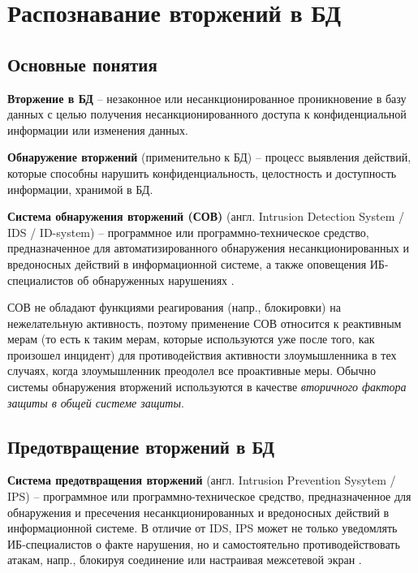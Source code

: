 
\section{Распознавание вторжений в БД}



\subsection{Основные понятия}

\textbf{Вторжение в БД} -- незаконное или несанкционированное проникновение в базу данных с целью получения несанкционированного доступа к конфиденциальной информации или изменения данных.

\textbf{Обнаружение вторжений} (применительно к БД) -- процесс выявления действий,
которые способны нарушить конфиденциальность, целостность и доступность информации,
хранимой в БД.

\textbf{Система обнаружения вторжений (СОВ)} (англ. Intrusion Detection System / IDS / ID-system) -- программное или программно-техническое средство, предназначенное для автоматизированного обнаружения несанкционированных и вредоносных действий в информационной системе, а также оповещения ИБ-специалистов об обнаруженных нарушениях \cite{kasperskyIDS}.

СОВ не обладают функциями реагирования (напр., блокировки) на нежелательную активность, поэтому применение СОВ относится к реактивным мерам (то есть к таким мерам, которые используются уже после того, как произошел инцидент) для противодействия активности злоумышленника в тех случаях, когда злоумышленник преодолел все проактивные меры. Обычно системы обнаружения вторжений используются в качестве \textit{вторичного фактора защиты в общей системе защиты}.



\subsection{Предотвращение вторжений в БД}

\textbf{Система предотвращения вторжений} (англ. Intrusion Prevention Sysytem / IPS) -- программное или программно-техническое средство, предназначенное для обнаружения и пресечения несанкционированных и вредоносных действий в информационной системе. В отличие от IDS, IPS может не только уведомлять ИБ-специалистов о факте нарушения, но и самостоятельно противодействовать атакам, напр., блокируя соединение или настраивая межсетевой экран \cite{kasperskyIPS}.

